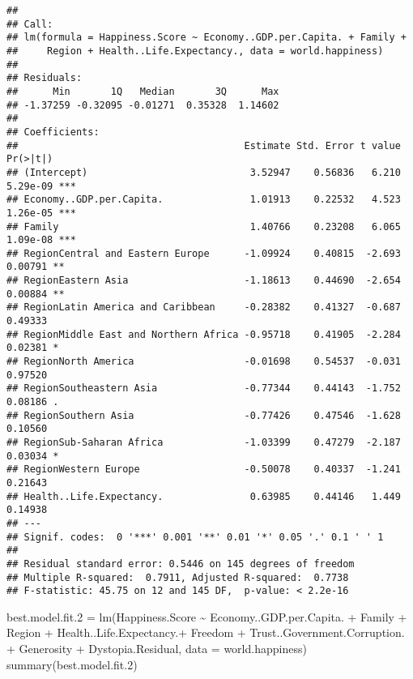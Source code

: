 \documentclass[
]{article}
\newenvironment{Shaded}{\begin{snugshade}}{\end{snugshade}}
\newcommand{\AttributeTok}[1]{\textcolor[rgb]{0.77,0.63,0.00}{#1}}
\newcommand{\FloatTok}[1]{\textcolor[rgb]{0.00,0.00,0.81}{#1}}
\newcommand{\FunctionTok}[1]{\textcolor[rgb]{0.00,0.00,0.00}{#1}}
\newcommand{\NormalTok}[1]{#1}
\newcommand{\OtherTok}[1]{\textcolor[rgb]{0.56,0.35,0.01}{#1}}
\newcommand{\SpecialCharTok}[1]{\textcolor[rgb]{0.00,0.00,0.00}{#1}}
\begin{document}
\begin{verbatim}
## 
## Call:
## lm(formula = Happiness.Score ~ Economy..GDP.per.Capita. + Family + 
##     Region + Health..Life.Expectancy., data = world.happiness)
## 
## Residuals:
##      Min       1Q   Median       3Q      Max 
## -1.37259 -0.32095 -0.01271  0.35328  1.14602 
## 
## Coefficients:
##                                       Estimate Std. Error t value Pr(>|t|)    
## (Intercept)                            3.52947    0.56836   6.210 5.29e-09 ***
## Economy..GDP.per.Capita.               1.01913    0.22532   4.523 1.26e-05 ***
## Family                                 1.40766    0.23208   6.065 1.09e-08 ***
## RegionCentral and Eastern Europe      -1.09924    0.40815  -2.693  0.00791 ** 
## RegionEastern Asia                    -1.18613    0.44690  -2.654  0.00884 ** 
## RegionLatin America and Caribbean     -0.28382    0.41327  -0.687  0.49333    
## RegionMiddle East and Northern Africa -0.95718    0.41905  -2.284  0.02381 *  
## RegionNorth America                   -0.01698    0.54537  -0.031  0.97520    
## RegionSoutheastern Asia               -0.77344    0.44143  -1.752  0.08186 .  
## RegionSouthern Asia                   -0.77426    0.47546  -1.628  0.10560    
## RegionSub-Saharan Africa              -1.03399    0.47279  -2.187  0.03034 *  
## RegionWestern Europe                  -0.50078    0.40337  -1.241  0.21643    
## Health..Life.Expectancy.               0.63985    0.44146   1.449  0.14938    
## ---
## Signif. codes:  0 '***' 0.001 '**' 0.01 '*' 0.05 '.' 0.1 ' ' 1
## 
## Residual standard error: 0.5446 on 145 degrees of freedom
## Multiple R-squared:  0.7911, Adjusted R-squared:  0.7738 
## F-statistic: 45.75 on 12 and 145 DF,  p-value: < 2.2e-16
\end{verbatim}

\begin{Shaded}
\begin{Highlighting}[]
\NormalTok{best.model.fit}\FloatTok{.2} \OtherTok{=} \FunctionTok{lm}\NormalTok{(Happiness.Score }\SpecialCharTok{\textasciitilde{}}\NormalTok{ Economy..GDP.per.Capita. }\SpecialCharTok{+}\NormalTok{ Family }\SpecialCharTok{+}\NormalTok{ Region }\SpecialCharTok{+}\NormalTok{ Health..Life.Expectancy.}\SpecialCharTok{+}\NormalTok{  Freedom }\SpecialCharTok{+}\NormalTok{ Trust..Government.Corruption. }\SpecialCharTok{+}\NormalTok{ Generosity }\SpecialCharTok{+}\NormalTok{ Dystopia.Residual, }\AttributeTok{data =}\NormalTok{ world.happiness)}
\FunctionTok{summary}\NormalTok{(best.model.fit}\FloatTok{.2}\NormalTok{)}
\end{Highlighting}
\end{Shaded}
\end{document}
